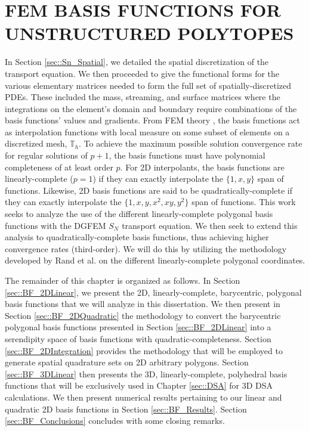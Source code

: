 %
%
%
\chapter{\uppercase {FEM Basis Functions for Unstructured Polytopes}}
\label{sec::BF}


In Section \ref{sec::Sn_Spatial}, we detailed the spatial discretization of the transport equation. We then proceeded to give the functional forms for the various elementary matrices needed to form the full set of spatially-discretized PDEs. These included the mass, streaming, and surface matrices where the integrations on the element's domain and boundary require combinations of the basis functions' values and gradients. From FEM theory \cite{ern2013theory}, the basis functions act as interpolation functions with local measure on some subset of elements on a discretized mesh, $\mathbb{T}_h$. To achieve the maximum possible solution convergence rate for regular solutions of $p+1$, the basis functions must have polynomial completeness of at least order $p$. For 2D interpolants, the basis functions are linearly-complete ($p=1$) if they can exactly interpolate the $\{ 1, x, y \}$ span of functions. Likewise, 2D basis functions are said to be quadratically-complete if they can exactly interpolate the $\{ 1, x, y, x^2, xy, y^2 \}$ span of functions. This work seeks to analyze the use of the different linearly-complete polygonal basis functions with the DGFEM $S_N$ transport equation. We then seek to extend this analysis to quadratically-complete basis functions, thus achieving higher convergence rates (third-order). We will do this by utilizing the methodology developed by Rand et al. \cite{rand2014quadratic} on the different linearly-complete polygonal coordinates.

The remainder of this chapter is organized as follows. In Section \ref{sec::BF_2DLinear}, we present the 2D, linearly-complete, barycentric, polygonal basis functions that we will analyze in this dissertation. We then present in Section \ref{sec::BF_2DQuadratic} the methodology to convert the barycentric polygonal basis functions presented in Section \ref{sec::BF_2DLinear} into a serendipity space of basis functions with quadratic-completeness. Section \ref{sec::BF_2DIntegration} provides the methodology that will be employed to generate spatial quadrature sets on 2D arbitrary polygons. Section \ref{sec::BF_3DLinear} then presents the 3D, linearly-complete, polyhedral basis functions that will be exclusively used in Chapter \ref{sec::DSA} for 3D DSA calculations. We then present numerical results pertaining to our linear and quadratic 2D basis functions in Section \ref{sec::BF_Results}. Section \ref{sec::BF_Conclusions} concludes with some closing remarks.

